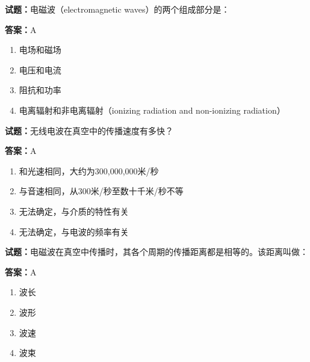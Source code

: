 \documentclass{ctexbook}
\begin{document}
\vspace{1em}

\textbf{试题：}电磁波（electromagnetic waves）的两个组成部分是： 

\textbf{答案：}A 

\begin{enumerate}[leftmargin=3em]
  \item 电场和磁场 

  \item 电压和电流 

  \item 阻抗和功率 

  \item 电离辐射和非电离辐射（ionizing radiation and non-ionizing radiation） 

\end{enumerate}





\vspace{1em}

\textbf{试题：}无线电波在真空中的传播速度有多快？ 

\textbf{答案：}A 

\begin{enumerate}[leftmargin=3em]
  \item 和光速相同，大约为300,000,000米/秒 

  \item 与音速相同，从300米/秒至数十千米/秒不等 

  \item 无法确定，与介质的特性有关 

  \item 无法确定，与电波的频率有关 

\end{enumerate}





\vspace{1em}

\textbf{试题：}电磁波在真空中传播时，其各个周期的传播距离都是相等的。该距离叫做： 

\textbf{答案：}A 

\begin{enumerate}[leftmargin=3em]
  \item 波长 

  \item 波形 

  \item 波速 

  \item 波束 

\end{enumerate}
\end{document}
